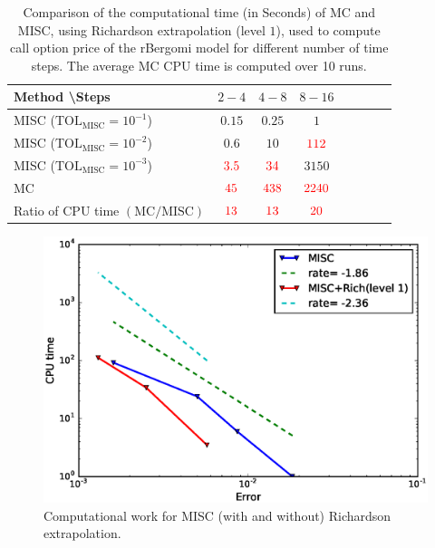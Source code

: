 \begin{table}[h!]
	\centering
	\begin{tabular}{l*{6}{c}r}
		Method \textbackslash  Steps            & $2-4$ & $4-8$ & $8-16$ &   \\
		\hline
		MISC ($\text{TOL}_{\text{MISC}}=10^{-1}$)   & $0.15$ & $0.25$ & $1$  \\
		MISC ($\text{TOL}_{\text{MISC}}=10^{-2}$)   & $0.6$ & $10$ & ${\color{red}112}$  \\
		MISC ($\text{TOL}_{\text{MISC}}=10^{-3}$)  & ${\color{red}3.5}$ & ${\color{red}34}$ & $3150$ \\
		\hline	
			MC  & ${\color{red}45}$  & ${\color{red}438}$  & ${\color{red}2240}$ \\
			
			\hline
				Ratio of CPU time  $\left(\text{MC}/ \text{MISC} \right)$   & ${\color{red}13}$  & ${\color{red}13}$  & ${\color{red}20}$ \\

		\hline
	\end{tabular}
	\caption{Comparison of the computational time (in Seconds) of  MC and MISC, using Richardson extrapolation (level $1$), used to compute call option price of the rBergomi model for different number of time steps. The
average MC CPU time is computed over 10 runs.}
	\label{Comparsion of the computational time of  MC and MISC, using Richardson extrapolation (level $1$), used to compute Call option price of rBergomi model for different number of time steps. Case set $3$ parameters}
\end{table}

\FloatBarrier


	\begin{figure}[h!]
	\centering
	\includegraphics[width=0.5\linewidth]{./figures/rBergomi_Complexity_rates/set5/error_vs_time_set5_comparison}
	
	\caption{Computational work for  MISC (with and without) Richardson extrapolation.}
	\label{fig:Complexity plot for  MISC for case set $3$ parameters, comparison}
\end{figure}


